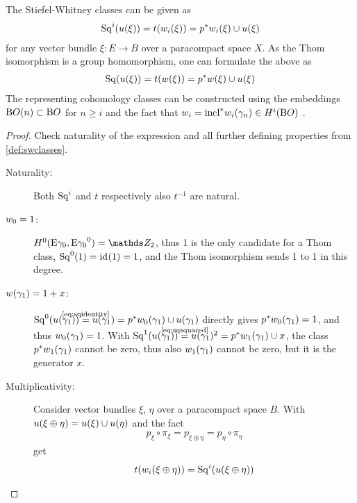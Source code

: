 \begin{Thm}\label{thm:altdefswclasses}
  The Stiefel-Whitney classes can be given as
  \begin{gather*}
    \mathrm{Sq}^{i}({u}(\xi)) = t({w_{i}}(\xi)) = {p}^* {w_{i}}(\xi) \cup {u}(\xi)
  \end{gather*}
  for any vector bundle $\xi\colon E\to B$ over a paracompact space
  $X$. As the Thom isomorphism is a group homomorphism, one can
  formulate the above as
  \begin{gather*}
    \mathrm{Sq}({u}(\xi)) = t({w}(\xi)) = {p}^* {w}(\xi) \cup {u}(\xi)
  \end{gather*}
  The representing cohomology classes can be constructed using the
  embeddings $\mathrm{B}O(n)\subset\mathrm{B}O$ for $n\geq i$ and the fact that
  $w_{i}={\mathrm{incl}}^*{w_{i}}(\gamma_n)\in H^i(\mathrm{B}O)$
  \cite[see \forexample][Theorem~7.1~ff.]{milnor}.
  \begin{proof}
    Check naturality of the expression and all further
    defining properties from \autoref{def:swclasses}.
    \begin{description}
    \item[Naturality:] Both $\mathrm{Sq}^{i}$ and $t$ respectively also $t^{-1}$
      are natural.
    \item[$w_{0}=1$:]
      $\H^0(\thomspacepair{\E{\gamma_0}}) = \Zmod2$, thus 1 is the only
      candidate for a Thom class, $\mathrm{Sq}^{0}(1) = \mathrm{id}_{}(1) = 1$, and the Thom
      isomorphism sends 1 to 1 in this degree.
    \item[${w}(\gamma_1)=1+x$:]
      $\Sq 0(\u{\gamma_1})\cequalsby{\eqref{eq:sqidentity}}\u{\gamma_1}
      = \pb p\w{0}{\gamma_1}\cup\u{\gamma_1}$
      directly gives
      ${p}^*{w_{0}}(\gamma_1)=1$, and thus ${w_{0}}(\gamma_1)=1$.
      With
      $\Sq 1(\u{\gamma_1})\cequalsby{\eqref{eq:sqsquared}}\u{\gamma_1}^2
      =\pb p\w{1}{\gamma_1}\cup x$,
      the class ${p}^*{w_{1}}(\gamma_1)$ cannot be zero, thus also
      ${w_{1}}(\gamma_1)$ cannot be zero, but it is the generator $x$.
    \item[Multiplicativity:]
      Consider vector bundles $\xi$, $\eta$ over a paracompact space
      $B$. With ${u}(\xi\oplus\eta)={u}(\xi)\cup{u}(\eta)$ and the fact
      \begin{gather}\label{eq:projectionscommute}
        p_\xi\circ\pi_\xi = p_{\xi\oplus\eta} = p_\eta\circ\pi_\eta
      \end{gather}
      get
      \begin{align*}
        \thomiso(\w{i}{\xi\oplus\eta})
        &= \Sq i(\u{\xi\oplus\eta}) \\

\end{align*}
\end{description}
\end{proof}
\end{Thm}
